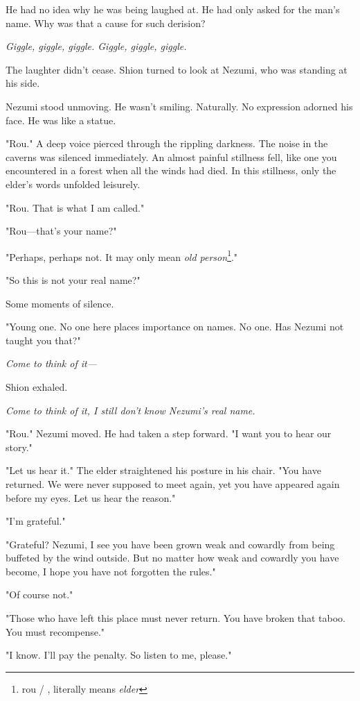 He had no idea why he was being laughed at. He had only asked for the
man's name. Why was that a cause for such derision?

\emph{Giggle, giggle, giggle. Giggle, giggle, giggle.}

The laughter didn't cease. Shion turned to look at Nezumi, who was
standing at his side.

Nezumi stood unmoving. He wasn't smiling. Naturally. No expression
adorned his face. He was like a statue.

"Rou." A deep voice pierced through the rippling darkness. The noise in
the caverns was silenced immediately. An almost painful stillness fell,
like one you encountered in a forest when all the winds had died. In
this stillness, only the elder's words unfolded leisurely.

"Rou. That is what I am called."

"Rou---that's your name?"

"Perhaps, perhaps not. It may only mean \emph{old person}\footnote{rou / , literally means \emph{elder}}."

"So this is not your real name?"

Some moments of silence.

"Young one. No one here places importance on names. No one. Has Nezumi
not taught you that?"

\emph{Come to think of it---}

Shion exhaled.

\emph{Come to think of it, I still don't know Nezumi's real name.}

"Rou." Nezumi moved. He had taken a step forward. "I want you to hear
our story."

"Let us hear it." The elder straightened his posture in his chair. "You
have returned. We were never supposed to meet again, yet you have
appeared again before my eyes. Let us hear the reason."

"I'm grateful."

"Grateful? Nezumi, I see you have been grown weak and cowardly from
being buffeted by the wind outside. But no matter how weak and cowardly
you have become, I hope you have not forgotten the rules."

"Of course not."

"Those who have left this place must never return. You have broken that
taboo. You must recompense."

"I know. I'll pay the penalty. So listen to me, please."

